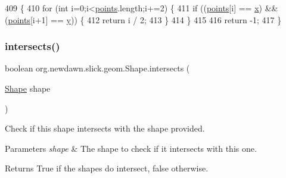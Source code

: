 \begin{DoxyCode}
409                                          \{
410         \textcolor{keywordflow}{for} (\textcolor{keywordtype}{int} i=0;i<\mbox{\hyperlink{classorg_1_1newdawn_1_1slick_1_1geom_1_1_shape_a8b4d4058734bbb3b96072e470b92aa37}{points}}.length;i+=2) \{
411             \textcolor{keywordflow}{if} ((\mbox{\hyperlink{classorg_1_1newdawn_1_1slick_1_1geom_1_1_shape_a8b4d4058734bbb3b96072e470b92aa37}{points}}[i] == \mbox{\hyperlink{classorg_1_1newdawn_1_1slick_1_1geom_1_1_shape_a3e985bfff386c15a4efaad03d8ad60d3}{x}}) && (\mbox{\hyperlink{classorg_1_1newdawn_1_1slick_1_1geom_1_1_shape_a8b4d4058734bbb3b96072e470b92aa37}{points}}[i+1] == \mbox{\hyperlink{classorg_1_1newdawn_1_1slick_1_1geom_1_1_shape_a9f934baded6a1b65ebb69e7e5f80ea00}{y}})) \{
412                 \textcolor{keywordflow}{return} i / 2;
413             \}
414         \}
415         
416         \textcolor{keywordflow}{return} -1;
417     \}
\end{DoxyCode}
\mbox{\label{classorg_1_1newdawn_1_1slick_1_1geom_1_1_shape_a5726456feb401f1cbd443b3f1faf0d40}} 
\subsubsection{\texorpdfstring{intersects()}{intersects()}}
{\footnotesize\ttfamily boolean org.\+newdawn.\+slick.\+geom.\+Shape.\+intersects (\begin{DoxyParamCaption}\item[{\mbox{\hyperlink{classorg_1_1newdawn_1_1slick_1_1geom_1_1_shape}{Shape}}}]{shape }\end{DoxyParamCaption})\hspace{0.3cm}{\ttfamily [inline]}}

Check if this shape intersects with the shape provided.


\begin{DoxyParams}{Parameters}
{\em shape} & The shape to check if it intersects with this one. \\
\hline
\end{DoxyParams}
\begin{DoxyReturn}{Returns}
True if the shapes do intersect, false otherwise. 
\end{DoxyReturn}

